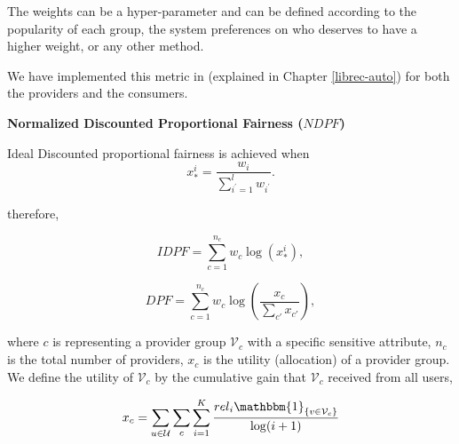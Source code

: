         The weights can be a hyper-parameter and can be defined according to the popularity of each group, the system preferences on who deserves to have a higher weight, or any other method.
        
        We have implemented this metric in \libauto{} (explained in Chapter \ref{librec-auto}) for both the providers and the consumers.
        
        
        
        
        \textbf{Normalized Discounted Proportional Fairness ($NDPF$)}

        Ideal Discounted proportional fairness is achieved when
        \begin{equation}
        x_*^i=\frac{w_i}{\sum_{i^{'}=1}^lw_{i^{'}}}.
        \end{equation}
        
        therefore,
        
        \begin{equation*}
            \text{$IDPF$}=\sum_{c=1}^{n_c} w_c \log\left(x_*^i\right),
        \end{equation*}
        
        
        \begin{equation*}
            \text{$DPF$}=\sum_{c=1}^{n_c} w_c \log\left(\frac{x_c}{\sum_{c'}x_{c'}}\right),
        \end{equation*}
        
        where $c$ is representing a provider group $\mathcal V_c$ with a specific sensitive attribute, $n_c$ is the total number of providers, $x_c$ is the utility (allocation) of a provider group. We define the utility of $\mathcal V_c$ by the cumulative gain that $\mathcal V_c$ received from all users,
        
        \begin{equation*}
        x_c=\sum_{u\in\mathcal U}\sum_{c}\sum_{i=1}^K\frac{{rel}_i\mathbbm{1}_{\{v\in \mathcal V_{c}\}}}{\log(i+1)}
        \end{equation*}
        
